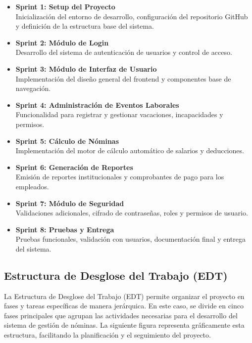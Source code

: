 \begin{itemize}
	\item \textbf{Sprint 1: Setup del Proyecto} \\
	      Inicialización del entorno de desarrollo, configuración del repositorio GitHub y definición de la estructura base del sistema.

	\item \textbf{Sprint 2: Módulo de Login} \\
	      Desarrollo del sistema de autenticación de usuarios y control de acceso.

	\item \textbf{Sprint 3: Módulo de Interfaz de Usuario} \\
	      Implementación del diseño general del frontend y componentes base de navegación.

	\item \textbf{Sprint 4: Administración de Eventos Laborales} \\
	      Funcionalidad para registrar y gestionar vacaciones, incapacidades y permisos.

	\item \textbf{Sprint 5: Cálculo de Nóminas} \\
	      Implementación del motor de cálculo automático de salarios y deducciones.

	\item \textbf{Sprint 6: Generación de Reportes} \\
	      Emisión de reportes institucionales y comprobantes de pago para los empleados.

	\item \textbf{Sprint 7: Módulo de Seguridad} \\
	      Validaciones adicionales, cifrado de contraseñas, roles y permisos de usuario.

	\item \textbf{Sprint 8: Pruebas y Entrega} \\
	      Pruebas funcionales, validación con usuarios, documentación final y entrega del sistema.
\end{itemize}

\newpage

\subsection{Estructura de Desglose del Trabajo (EDT)}

La Estructura de Desglose del Trabajo (EDT) permite organizar el proyecto en fases y
tareas específicas de manera jerárquica. En este caso, se divide en cinco fases principales
que agrupan las actividades necesarias para el desarrollo del sistema de gestión de nóminas.
La siguiente figura representa gráficamente esta estructura, facilitando la planificación y el seguimiento del proyecto.

